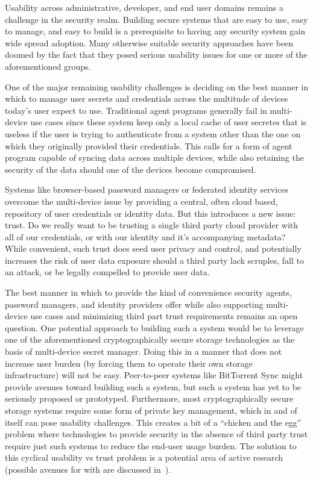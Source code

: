 \documentclass{sig-alternate}
\begin{document}
Usability across administrative, developer, and end user domains
remains a challenge in the security realm. Building secure systems
that are easy to use, easy to manage, and easy to build is a
prerequisite to having any security system gain wide spread
adoption. Many otherwise suitable security approaches have been doomed
by the fact that they posed serious usability issues for one or more
of the aforementioned groups.

One of the major remaining usability challenges is deciding on the
best manner in which to manage user secrets and credentials across the
multitude of devices today's user expect to use. Traditional agent
programs generally fail in multi-device use cases since these system
keep only a local cache of user secretes that is useless if the user
is trying to authenticate from a system other than the one on which
they originally provided their credentials. This calls for a form of
agent program capable of syncing data across multiple devices, while
also retaining the security of the data should one of the devices
become compromised.

Systems like browser-based password managers or federated identity
services overcome the multi-device issue by providing a central, often
cloud based, repository of user credentials or identity data. But this
introduces a new issue: trust. Do we really want to be trusting a
single third party cloud provider with all of our credentials, or with
our identity and it's accompanying metadata? While convenient, such
trust does seed user privacy and control, and potentially increases
the risk of user data exposure should a third party lack scruples,
fall to an attack, or be legally compelled to provide user data.

The best manner in which to provide the kind of convenience security
agents, password managers, and identity providers offer while also
supporting multi-device use cases and minimizing third part trust
requirements remains an open question. One potential approach to
building such a system would be to leverage one of the aforementioned
cryptographically secure storage technologies as the basis of
multi-device secret manager. Doing this in a manner that does not
increase user burden (by forcing them to operate their own storage
infrastructure) will not be easy. Peer-to-peer systems like BitTorrent
Sync might provide avenues toward building such a system, but such a
system has yet to be seriously proposed or prototyped. Furthermore,
most cryptographically secure storage systems require some form of
private key management, which in and of itself can pose usability
challenges. This creates a bit of a ``chicken and the egg'' problem
where technologies to provide security in the absence of third party
trust require just such systems to reduce the end-user usage
burden. The solution to this cyclical usability vs trust problem is a
potential area of active research (possible avenues for with are
discussed in~\cite{custos-masters}).
\end{document}

